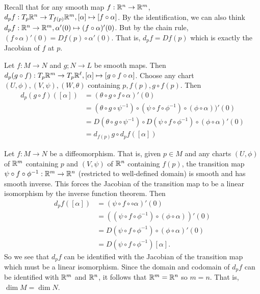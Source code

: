 \documentclass[12pt]{article}
\begin{document}
\begin{problem}[5.8]
	Recall that for any smooth map $ f: \mathbb{R}^{n} \to \mathbb{R}^{m}$, $ d_pf : T_p \mathbb{R}^{n} \to T_{f(p)} \mathbb{R}^{m}, [ \alpha] \mapsto [f \circ \alpha]$. By the identification, we can also think $ d_pf: \mathbb{R}^{n} \to \mathbb{R}^{m}, \alpha'(0) \mapsto (f \circ \alpha)'(0)$. But by the chain rule, $ (f \circ \alpha)'(0) = Df(p) \circ \alpha'(0)$. That is, $ d_p f = Df(p)$ which is exactly the Jacobian of $ f$ at $ p$.
\end{problem}
\begin{problem}[5.9]
	Let $ f:M \to N$ and $ g; N \to L$ be smooth maps. Then $ d_p(g \circ f): T_p \mathbb{R}^{m} \to T_p \mathbb{R}^{ \ell}, [ \alpha] \mapsto [g \circ f \circ \alpha]$. Choose any chart $ (U,\phi),(V, \psi),(W, \theta)$ containing $ p,f(p), g \circ f(p)$. Then
\begin{align*}
	d_p(g \circ f)([ \alpha]) &=(\theta \circ g \circ f \circ \alpha)'(0) \\
	&= (\theta \circ g \circ  \psi ^{-1}) \circ (\psi \circ f \circ \phi ^{-1}) \circ (\phi \circ \alpha))'(0) \\
	&= D (\theta \circ g \circ \psi ^{-1}) \circ D( \psi \circ  f \circ \phi ^{-1}) \circ ( \phi \circ \alpha)'(0) \\
	&= d_{f(p)} g \circ d_pf ( [ \alpha]) 
\end{align*}
\end{problem}

\begin{problem}[5.10]
Let $ f: M \to N$ be a diffeomorphism. That is, given $ p \in M$ and any charts $ (U,\phi)$ of $ \mathbb{R}^{m}$ containing $ p$ and $ (V, \psi)$ of $ \mathbb{R}^{n}$ containing $ f(p)$, the transition map $ \psi \circ f \circ \phi ^{-1}: \mathbb{R}^{m} \to \mathbb{R}^{n}$ (restricted to well-defined domain) is smooth and has smooth inverse. This forces the Jacobian of the transition map to be a linear isomorphism by the inverse function theorem. Then
\begin{align*}
	d_pf ([ \alpha]) &= (\psi \circ f \circ \circ \alpha)'(0) \\
	&= ((\psi \circ f \circ \phi ^{-1} )\circ (\phi \circ \alpha))'(0) \\
	&= D(\psi \circ f \circ \phi ^{-1}) \circ (\phi \circ \alpha)'(0) \\
	&= D(\psi \circ f \circ \phi ^{-1})[ \alpha] .
\end{align*}
So we see that $ d_pf$ can be identified with the Jacobian of the transition map which must be a linear isomorphism. Since the domain and codomain of $ d_pf$ can be identified with  $ \mathbb{R}^{m}$ and $ \mathbb{R}^{n}$, it follows that $ \mathbb{R}^{m} = \mathbb{R}^{n}$ so $ m=n$. That is,  $ \dim M = \dim N$.
\end{problem}
\end{document}
